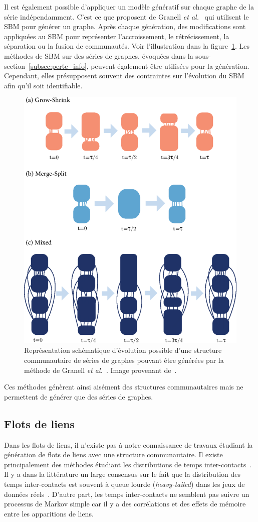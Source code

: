 Il est également possible d'appliquer un modèle génératif sur chaque graphe de la série indépendamment.
C'est ce que proposent de Granell \emph{et al.}~\cite{Granell2015a} qui utilisent le SBM pour générer un graphe.
Après chaque génération, des modifications sont appliquées au SBM pour représenter l'accroissement, le rétrécissement, la séparation ou la fusion de communautés.
Voir l'illustration dans la figure~\ref{fig:qualite_Grannell}.
Les méthodes de SBM sur des séries de graphes, évoquées dans la sous-section~\ref{subsec:perte_info}, peuvent également être utilisées pour la génération.
Cependant, elles présupposent souvent des contraintes sur l'évolution du SBM afin qu'il soit identifiable.

\begin{figure}
\centering
\includegraphics[width=0.4\linewidth]{img/Qualite/Granell.png}
\caption{Représentation schématique d'évolution possible d'une structure communautaire de séries de graphes pouvant être générées par la méthode de Granell \emph{et al.}~\cite{Granell2015a}. Image provenant de~\cite{Granell2015a}.}
\label{fig:qualite_Grannell}
\end{figure}

Ces méthodes génèrent ainsi aisément des structures communautaires mais ne permettent de générer que des séries de graphes.

\subsection{Flots de liens}

Dans les flots de liens, il n'existe pas à notre connaissance de travaux étudiant la génération de flots de liens avec une structure communautaire.
Il existe principalement des méthodes étudiant les distributions de temps inter-contacts~\cite{Malmgren2008,Malmgren2009,Vestergaard2014}.
Il y a dans la littérature un large consensus sur le fait que la distribution des temps inter-contacts est souvent à queue lourde (\emph{heavy-tailed}) dans les jeux de données réels~\cite{Karsai2011,Karsai2012a,Kivela2015}.
D'autre part, les temps inter-contacts ne semblent pas suivre un processus de Markov simple car il y a des corrélations et des effets de mémoire entre les apparitions de liens.

